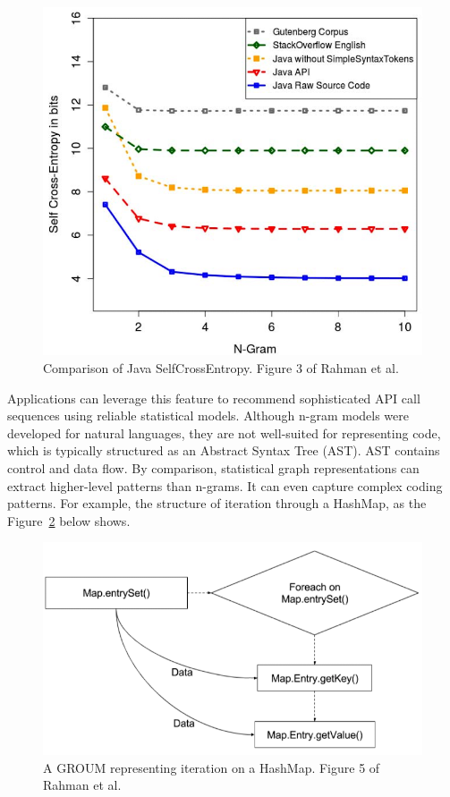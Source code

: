 \documentclass[runningheads]{llncs}
\begin{document}
\begin{figure}[h]
\centering
    \includegraphics[width=\textwidth]{fig2}
    \caption{Comparison of Java SelfCrossEntropy. Figure 3 of Rahman et al.\cite{0_ref_proc1}}\label{fig2}
\end{figure}

Applications can leverage this feature to recommend sophisticated API call sequences using reliable statistical models. Although n-gram models were developed for natural languages, they are not well-suited for representing code, which is typically structured as an Abstract Syntax Tree (AST). AST contains control and data flow. By comparison, statistical graph representations can extract higher-level patterns than n-grams. It can even capture complex coding patterns. For example, the structure of iteration through a HashMap, as the Figure~\ref{fig3} below shows.

\begin{figure}[h]
\centering
    \includegraphics[width=\textwidth]{fig3}
    \caption{A GROUM representing iteration on a HashMap. Figure 5 of Rahman et al.\cite{0_ref_proc1}}\label{fig3}
\end{figure}
\end{document}
